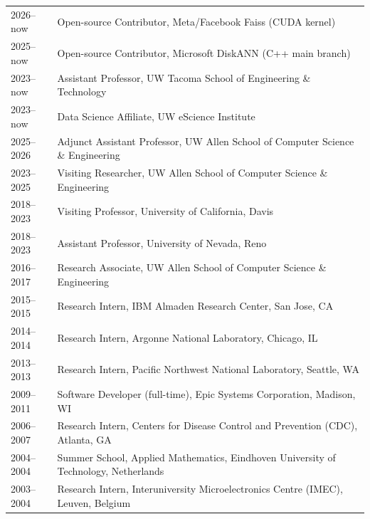 \documentclass[11pt]{scrartcl}
\newcommand{\arygap}{.9}
\begin{document}
\begin{table}[!ht]
{\def\arraystretch{\arygap}\tabcolsep=0pt
\begin{tabular}{p{0.13\linewidth}p{0.87\linewidth}}

2026--now & Open-source Contributor, Meta/Facebook Faiss (CUDA kernel)\\
2025--now & Open-source Contributor, Microsoft DiskANN (C++ main branch)\\
2023--now & Assistant Professor, UW Tacoma School of Engineering \& Technology\\ 
2023--now & Data Science Affiliate, UW eScience Institute\\ 
2025--2026 & Adjunct Assistant Professor, UW Allen School of Computer Science \& Engineering\\
2023--2025 & Visiting Researcher, UW Allen School of Computer Science \& Engineering\\
2018--2023 & Visiting Professor, University of California, Davis \\
2018--2023 & Assistant Professor, University of Nevada, Reno \\ 
2016--2017 & Research Associate, UW Allen School of Computer Science \& Engineering\\
  2015--2015 & Research Intern, IBM Almaden Research Center, San Jose, CA \\
  2014--2014 & Research Intern, Argonne National Laboratory, Chicago, IL \\
  2013--2013 & Research Intern, Pacific Northwest National Laboratory, Seattle, WA\\
   2009--2011 & Software Developer (full-time), Epic Systems Corporation, Madison, WI\\
2006--2007 & Research Intern, Centers for Disease Control and Prevention (CDC), Atlanta, GA\\
2004--2004 & Summer School, Applied Mathematics, Eindhoven University of Technology, Netherlands\\
2003--2004 & Research Intern, Interuniversity Microelectronics Centre (IMEC), Leuven, Belgium
  
\end{tabular}%
}
\end{table}

\end{document}
